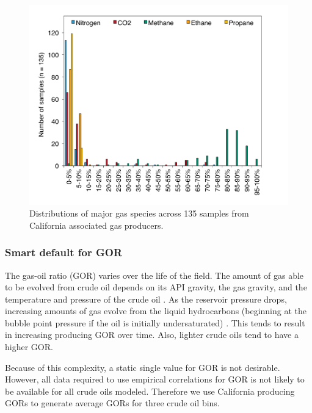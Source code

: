 \documentclass[11pt]{report}
\newcommand{\marg}[1]{{\footnotesize\textit{\textcolor{stanford}{'#1'}}}}
\newcommand{\marginnote}[1]{\marginpar{\marg{#1}}}
\begin{document}
\begin{figure}
\includegraphics[width=0.8\columnwidth]{images/gas_comp_major.pdf}
\caption{Distributions of major gas species across 135 samples from California associated gas producers.}
\label{fig:gas_comp_major}
\end{figure}

\subsubsection{Smart default for GOR} \label{sec:GOR_default}

The gas-oil ratio (GOR) varies over the life of the field. The amount of gas able to be evolved from crude oil depends on its API gravity, the gas gravity, and the temperature and pressure of the crude oil \cite[p. 297]{Mccain1990}. As the reservoir pressure drops, increasing amounts of gas evolve from the liquid hydrocarbons (beginning at the bubble point pressure if the oil is initially undersaturated) \cite{Mccain1990}. This tends to result in increasing producing GOR over time. Also, lighter crude oils tend to have a higher GOR. 

Because of this complexity, a static single value for GOR is not desirable. However, all data required to use empirical correlations for GOR is not likely to be available for all crude oils modeled. \marginnote{Active Field 2.4.1} Therefore we use California producing GORs to generate average GORs for three crude oil bins. 
\end{document}
